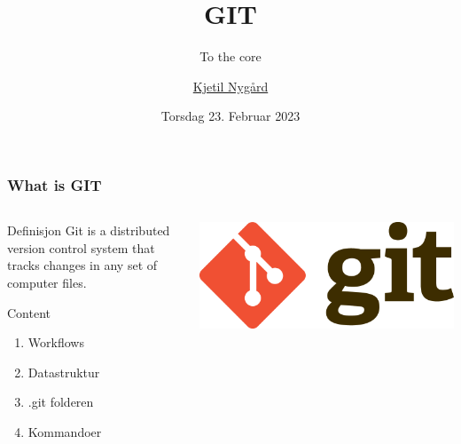 \documentclass{beamer}
\title{GIT}
\subtitle{To the core}
\author{\href{kjetil.nygard@tietoevry.com}{Kjetil Nygård}}
\institute{TietoEvry}
\date{Torsdag 23. Februar 2023}
\begin{document}
    \frame{\titlepage}


    \begin{frame}
        \frametitle{What is GIT}
        \begin{columns}[c]
            \begin{column}{.55\textwidth}
                \begin{block}{Definisjon}
                    Git is a distributed version control system that tracks changes
                    in any set of computer files.
                \end{block}
                \begin{block}{Content}
                    \begin{enumerate}
                        \item Workflows
                        \item Datastruktur
                        \item .git folderen
                        \item Kommandoer
                    \end{enumerate}
                \end{block}
            \end{column}
            \begin{column}{.45\textwidth}
                \begin{center}
                    \includegraphics[width=\textwidth]{images/Git-Logo-2Color}
                \end{center}
            \end{column}
        \end{columns}
    \end{frame}
\end{document}
